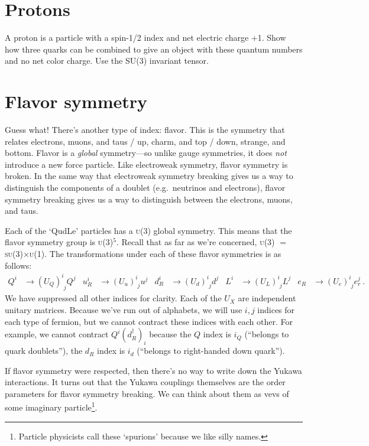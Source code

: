 \documentclass[12pt]{article}
\newcommand{\acro}[1]{\textsc{\MakeLowercase{#1}}}
\numberwithin{equation}{section}    %
\begin{document}
\section{Protons}

A proton is a particle with a spin-1/2 index and net electric charge +1. Show how three quarks can be combined to give an object with these quantum numbers and no net color charge. Use the SU(3) invariant tensor. 

\section{Flavor symmetry}

Guess what! There's another type of index: flavor. This is the symmetry that relates electrons, muons, and taus / up, charm, and top / down, strange, and bottom. Flavor is a \emph{global} symmetry---so unlike gauge symmetries, it does \emph{not} introduce a new force particle. Like electroweak symmetry, flavor symmetry is broken. In the same way that electroweak symmetry breaking gives us a way to distinguish the components of a doublet (e.g.\ neutrinos and electrons), flavor symmetry breaking gives us a way to distinguish between the electrons, muons, and taus. 

Each of the `QudLe' particles has a \acro{U(3)} global symmetry. This means that the flavor symmetry group is \acro{U(3)}$^5$. Recall that as far as we're concerned, \acro{U(3)} $=$ \acro{SU(3)}$\times$\acro{U(1)}. The transformations under each of these flavor symmetries is as follows: 
\begin{align}
	Q^i&\to \left(U_Q\right)^i_{\phantom{i}j} Q^j
	&
	u_R^i&\to \left(U_u\right)^i_{\phantom{i}j} u^j
	&
	d_R^i&\to \left(U_d\right)^i_{\phantom{i}j} d^j
	&
	L^i&\to \left(U_L\right)^i_{\phantom{i}j} L^j
	&
	e_R&\to \left(U_e\right)^i_{\phantom{i}j} e_r^j \ .
	\label{eq:gen}
\end{align}
We have suppressed all other indices for clarity. Each of the $U_X$ are independent unitary matrices. Because we've run out of alphabets, we will use $i,j$ indices for each type of fermion, but we cannot contract these indices with each other. For example, we cannot contract $Q^i (d_R^\dag)_i$ because the $Q$ index is $i_Q$ (``belongs to quark doublets''), the $d_R$ index is $i_d$ (``belongs to right-handed down quark'').

If flavor symmetry were respected, then there's no way to write down the Yukawa interactions. It turns out that the Yukawa couplings themselves are the order parameters for flavor symmetry breaking. We can think about them as vevs of some imaginary particle\footnote{Particle physicists call these `spurions' because we like silly names.}. 
\end{document}

